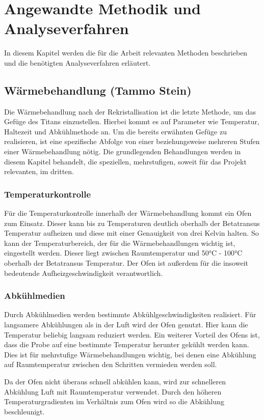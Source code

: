\documentclass[a4paper, 11pt]{tubsreprt}
\begin{document}
\chapter{Angewandte Methodik und Analyseverfahren}

In diesem Kapitel werden die für die Arbeit relevanten Methoden beschrieben und die benötigten Analyseverfahren erläutert.
\section{Wärmebehandlung (Tammo Stein)}

Die Wärmebehandlung nach der Rekristallisation ist die letzte Methode, um das Gefüge des Titans einzustellen. Hierbei kommt es auf Parameter wie Temperatur, Haltezeit und Abkühlmethode an. Um die bereits erwähnten Gefüge zu realisieren, ist eine spezifische Abfolge von einer beziehungsweise mehreren Stufen einer Wärmebehandlung nötig. Die grundlegenden Behandlungen werden in diesem Kapitel behandelt, die speziellen, mehrstufigen, soweit für das Projekt relevanten, im dritten.
\subsection{Temperaturkontrolle}
Für die Temperaturkontrolle innerhalb der Wärmebehandlung kommt ein Ofen zum Einsatz. Dieser kann bis zu Temperaturen deutlich oberhalb der Betatransus Temperatur aufheizen und diese mit einer Genauigkeit von drei Kelvin halten. So kann der Temperaturbereich, der für die Wärmebehandlungen wichtig ist, eingestellt werden. Dieser liegt zwischen Raumtemperatur und 50°C - 100°C oberhalb der Betatransus Temperatur. Der Ofen ist außerdem für die insoweit bedeutende Aufheizgeschwindigkeit verantwortlich.

\subsection{Abkühlmedien}

Durch Abkühlmedien werden bestimmte Abkühlgeschwindigkeiten realisiert. Für langsamere Abkühlungen als in der Luft wird der Ofen genutzt. Hier kann die Temperatur beliebig langsam reduziert werden. Ein weiterer Vorteil des Ofens ist, dass die Probe auf eine bestimmte Temperatur herunter gekühlt werden kann. Dies ist für mehrstufige Wärmebehandlungen wichtig, bei denen eine Abkühlung auf Raumtemperatur zwischen den Schritten vermieden werden soll. 

Da der Ofen nicht überaus schnell abkühlen kann, wird zur schnelleren Abkühlung Luft mit Raumtemperatur verwendet. Durch den höheren Temperaturgradienten im Verhältnis zum Ofen wird so die Abkühlung beschleunigt.  
\end{document}
